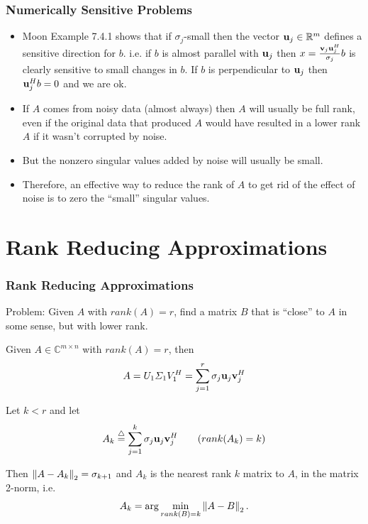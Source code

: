 \documentclass{beamer}
\begin{document}
\begin{frame}\frametitle{Numerically Sensitive Problems}
	\begin{itemize}
		\item Moon Example 7.4.1 shows that if $\sigma_j$-small then the vector $\mathbf{u}_j \in \mathbb{R}^m$ defines a sensitive direction for $b$.  i.e. if $b$ is almost parallel with $\mathbf{u}_j$ then $x = \frac{\mathbf{v}_j\mathbf{u}_j^H}{\sigma_j}b$ is clearly sensitive to small changes in $b$.  If $b$ is perpendicular to $\mathbf{u}_j$ then $\mathbf{u}_j^Hb=0$ and we are ok.
		\item If $A$ comes from noisy data (almost always) then $A$ will usually be full rank, even if the original data that produced $A$ would have resulted in a lower rank $A$ if it wasn't corrupted by noise.
		\item But the nonzero singular values added by noise will usually be small.
		\item Therefore, an effective way to reduce the rank of $A$ to get rid of the effect of noise is to zero the ``small'' singular values.
	\end{itemize}
\end{frame}


\section{Rank Reducing Approximations}
\frame{\sectionpage}

\begin{frame}\frametitle{Rank Reducing Approximations}
	{\color{blue}Problem:}  Given $A$ with $rank(A) = r$, find a matrix $B$ that is ``close'' to $A$ in some sense, but with lower rank.	
	
	\begin{theorem}	
		Given $A \in \mathbb{C}^{m\times n}$ with $rank(A)=r$, then
		\[
			A = U_1\Sigma_1V_1^H = \sum_{j=1}^r \sigma_j\mathbf{u}_j\mathbf{v}_j^H
		\]
		
		Let $k < r$ and let 
		\[ 
			A_k \stackrel{\triangle}{=} \sum_{j=1}^k\sigma_j\mathbf{u}_j\mathbf{v}_j^H \qquad (rank(A_k) = k) 
		\]
		
		Then $\left\|A-A_k\right\|_2 = \sigma_{k+1}$ and $A_k$ is the nearest rank $k$ matrix to $A$, in the matrix 2-norm, i.e.
		\[ 
			A_k = \arg\min_{rank(B)=k} \left\|A-B \right\|_2.
		\]
	\end{theorem}
\end{frame}
\end{document}
